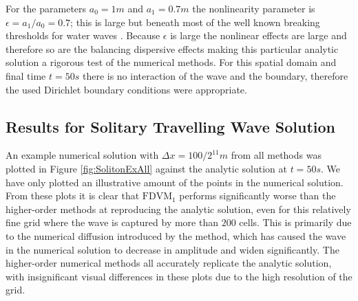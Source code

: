 For the parameters $a_0 = 1m$ and $a_1 = 0.7m$ the nonlinearity parameter is $\epsilon = a_1 / a_0 = 0.7$; this is large but beneath most of the well known breaking thresholds for water waves \cite{Ippen-Kulin-1954-4}. Because $\epsilon$ is large the nonlinear effects are large and therefore so are the balancing dispersive effects making this particular analytic solution a rigorous test of the numerical methods. For this spatial domain and final time $t=50s$ there is no interaction of the wave and the boundary, therefore the used Dirichlet boundary conditions were appropriate.

\subsection{Results for Solitary Travelling Wave Solution}
An example numerical solution with $\Delta x = {100} / {2^{11}}m$ from all methods was plotted in Figure \ref{fig:SolitonExAll} against the analytic solution at $t= 50s$. We have only plotted an illustrative amount of the points in the numerical solution. From these plots it is clear that $\text{FDVM}_1$ performs significantly worse than the higher-order methods at reproducing the analytic solution, even for this relatively fine grid where the wave is captured by more than $200$ cells. This is primarily due to the numerical diffusion introduced by the method, which has caused the wave in the numerical solution to decrease in amplitude and widen significantly. The higher-order numerical methods all accurately replicate the analytic solution, with insignificant visual differences in these plots due to the high resolution of the grid.

